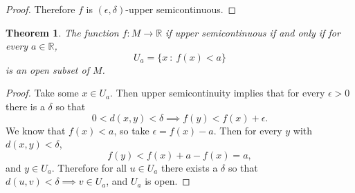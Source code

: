 \documentclass[letter]{article}
\newtheorem{theorem}{Theorem}
\newenvironment{menumerate}{%
  \edef\backupindent{\the\parindent}%
  \enumerate%
  \setlength{\parindent}{\backupindent}%
}{\endenumerate}
\begin{document}
\begin{menumerate}
\begin{menumerate}
\begin{proof}
        Therefore $f$ is  $(\epsilon, \delta)$-upper semicontinuous.
    \end{proof}
    \begin{theorem}
        The function $f: M \to \mathbb{R}$ if upper semicontinuous 
        if and only if for every $a \in \mathbb{R}$, 
        \begin{equation}
            U_a = \{ x \ :\ f(x) < a \}       
        \end{equation}
        is an open subset of $M$.
    \end{theorem}
    \begin{proof}
        Take some $x \in U_a$. Then upper semicontinuity implies that
        for every $\epsilon> 0$ there is a $\delta$ so that
        \begin{equation}
            0 < d(x,y) < \delta \implies f(y) < f(x) + \epsilon.       
         \end{equation}
         We know that $f(x) < a$, so take $\epsilon = f(x) - a.$
         Then for every $y$ with $d(x,y) < \delta$, 
         \begin{equation}
         f(y) < f(x) + a - f(x) = a,
         \end{equation}
         and $y \in U_a$. Therefore for all $u \in U_a$ there exists a $\delta$ so that $d(u,v) < \delta \implies v \in U_a$, and
         $U_a$ is open.


\end{proof}
\end{menumerate}
\end{menumerate}
\end{document}
